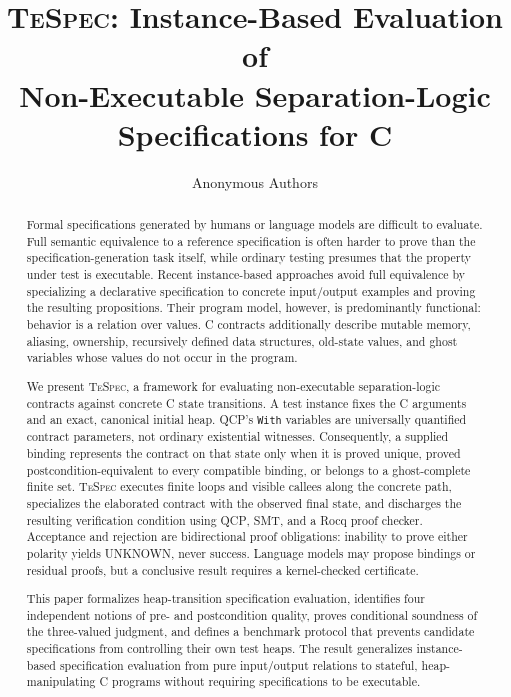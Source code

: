 \documentclass[10pt]{article}
\title{\textsc{TeSpec}: Instance-Based Evaluation of\\
Non-Executable Separation-Logic Specifications for C}
\author{Anonymous Authors}
\date{}
\newcommand{\tespec}{\textsc{TeSpec}}
\newcommand{\qcp}{\textsc{QCP}}
\newcommand{\rocq}{Rocq}
\newcommand{\unknown}{\textsf{UNKNOWN}}
\begin{document}
\maketitle

\begin{abstract}
Formal specifications generated by humans or language models are difficult to
evaluate.  Full semantic equivalence to a reference specification is often
harder to prove than the specification-generation task itself, while ordinary
testing presumes that the property under test is executable.  Recent
instance-based approaches avoid full equivalence by specializing a declarative
specification to concrete input/output examples and proving the resulting
propositions.  Their program model, however, is predominantly functional:
behavior is a relation over values.  C contracts additionally describe mutable
memory, aliasing, ownership, recursively defined data structures, old-state
values, and ghost variables whose values do not occur in the program.

We present \tespec, a framework for evaluating non-executable
separation-logic contracts against concrete C state transitions.  A test
instance fixes the C arguments and an exact, canonical initial heap.
QCP's \texttt{With} variables are universally quantified contract parameters,
not ordinary existential witnesses.  Consequently, a supplied binding
represents the contract on that state only when it is proved unique, proved
postcondition-equivalent to every compatible binding, or belongs to a
ghost-complete finite set.  \tespec{} executes finite loops and visible callees
along the concrete path, specializes the elaborated contract with the observed
final state, and discharges the resulting verification condition using
\qcp, SMT, and a \rocq{} proof checker.  Acceptance and rejection are
bidirectional proof obligations: inability to prove either polarity yields
\unknown, never success.  Language models may propose bindings or residual
proofs, but a conclusive result requires a kernel-checked certificate.

This paper formalizes heap-transition specification evaluation, identifies four
independent notions of pre- and postcondition quality, proves conditional
soundness of the three-valued judgment, and defines a benchmark protocol that
prevents candidate specifications from controlling their own test heaps.  The
result generalizes instance-based specification evaluation from pure
input/output relations to stateful, heap-manipulating C programs without
requiring specifications to be executable.
\end{abstract}
\end{document}
